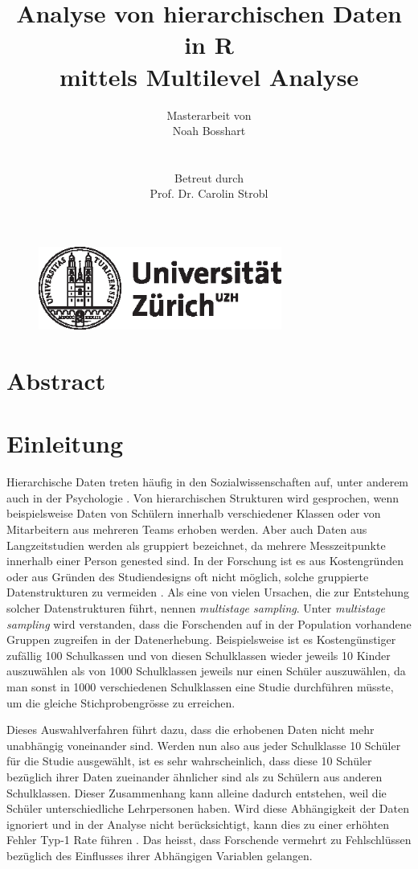 \documentclass[12pt]{article}\usepackage[]{graphicx}\usepackage[]{color}
\title{Analyse von hierarchischen Daten in R \\ mittels Multilevel Analyse}
\author{Masterarbeit von \\ Noah Bosshart \\ \\ \\ Betreut durch \\ Prof. Dr. Carolin Strobl}
\begin{document}
\begin{figure}[t]
  \centering
  \includegraphics[width = 8cm]{uzh_logo}
\end{figure}

\maketitle

\newpage
\tableofcontents

\newpage
\section{Abstract}

\newpage

\section{Einleitung}
Hierarchische Daten treten häufig in den Sozialwissenschaften auf, unter anderem auch in der Psychologie \citep{SnijdersTomA.B2012Ma:a}. Von hierarchischen Strukturen wird gesprochen, wenn beispielsweise Daten von Schülern innerhalb verschiedener Klassen oder von Mitarbeitern aus mehreren Teams erhoben werden. Aber auch Daten aus Langzeitstudien werden als gruppiert bezeichnet, da mehrere Messzeitpunkte innerhalb einer Person genested sind. In der Forschung ist es aus Kostengründen oder aus Gründen des Studiendesigns oft nicht möglich, solche gruppierte Datenstrukturen zu vermeiden \citep{SnijdersTomA.B2012Ma:a, woltman2012introduction}. Als eine von vielen Ursachen, die zur Entstehung solcher Datenstrukturen führt, nennen \cite{SnijdersTomA.B2012Ma:a} \textit{multistage sampling}. Unter \textit{multistage sampling} wird verstanden, dass die Forschenden auf in der Population vorhandene Gruppen zugreifen in der Datenerhebung. Beispielsweise ist es Kostengünstiger zufällig 100 Schulkassen und von diesen Schulklassen wieder jeweils 10 Kinder auszuwählen als von 1000 Schulklassen jeweils nur einen Schüler auszuwählen, da man sonst in 1000 verschiedenen Schulklassen eine Studie durchführen müsste, um die gleiche Stichprobengrösse zu erreichen. 

Dieses Auswahlverfahren führt dazu, dass die erhobenen Daten nicht mehr unabhängig voneinander sind. Werden nun also aus jeder Schulklasse 10 Schüler für die Studie ausgewählt, ist es sehr wahrscheinlich, dass diese 10 Schüler bezüglich ihrer Daten zueinander ähnlicher sind als zu Schülern aus anderen Schulklassen. Dieser Zusammenhang kann alleine dadurch entstehen, weil die Schüler unterschiedliche Lehrpersonen haben. Wird diese Abhängigkeit der Daten ignoriert und in der Analyse nicht berücksichtigt, kann dies zu einer erhöhten Fehler Typ-1 Rate führen \citep{dorman2008effect, mcneish2014analyzing}. Das heisst, dass Forschende vermehrt zu Fehlschlüssen bezüglich des Einflusses ihrer Abhängigen Variablen gelangen. 
\end{document}
